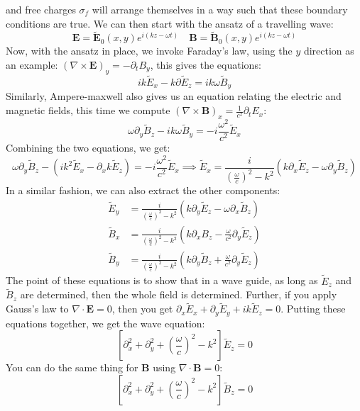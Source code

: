 \) and free charges \( \sigma_f \) will arrange themselves in a way such that these boundary conditions are
true. We can then start with the ansatz of a travelling wave:
\[
	\mathbf{E} = \tilde{\mathbf{E}}_0(x, y)e^{i(kz - \omega t)} \quad \mathbf{B} = \tilde{\mathbf{B}}_0(x, y) e^{i(kz
	- \omega t)}
\]
Now, with the ansatz in place, we invoke Faraday's law, using the \( y \) direction as an example:
\( (\nabla \times \mathbf{E})_y = -\partial_t B_y \), this gives the equations:
\[
	ik \tilde E_x - k \partial \tilde E_z = ik \omega \tilde B_y
\]
Similarly, Ampere-maxwell also gives us an equation relating the electric and magnetic fields, this time we
compute \( (\nabla \times \mathbf{B})_x = \frac{1}{c^2}\partial_t E_x \):
\[
	\omega \partial_y \tilde B_z - i k \omega \tilde B_y = -i \frac{\omega^2}{c^2}\tilde E_x
\]
Combining the two equations, we get:
\[
	\omega \partial_y \tilde B_z - (ik^2 \tilde E_x - \partial_x k \tilde E_z) = -i
	\frac{\omega^2}{c^2}\tilde E_x \implies \tilde E_x = \frac{i}{\left( \frac{\omega}{c} \right)^2 - k^2}(k
	\partial_x \tilde E_z - \omega \partial_y \tilde B_z)
\]
In a similar fashion, we can also extract the other components:
\begin{align*}
	\tilde E_y &= \frac{i}{\left( \frac{\omega}{c} \right)^2 - k^2} (k \partial_y \tilde E_z - \omega
	\partial_x \tilde B_z)\\
	\tilde B_x &= \frac{i}{\left( \frac{\omega}{c} \right)^2 - k^2}(k \partial_x B_z -
	\frac{\omega}{c^2}\partial_y \tilde E_z)\\
	\tilde B_y &= \frac{i}{\left( \frac{\omega}{c} \right)^2 - k^2} (k \partial_y \tilde B_z +
	\frac{\omega}{c^2}\partial_y \tilde E_z)
\end{align*}
The point of these equations is to show that in a wave guide, as long as \( \tilde E_z \) and \( \tilde B_z \) 
are determined, then the whole field is determined. Further, if you apply Gauss's law to \( \nabla \cdot
\mathbf{E} = 0 \), then you get \( \partial_x \tilde E_x + \partial_y \tilde E_y + ik \tilde E_z = 0 \).
Putting these equations together, we get the wave equation:
\[
	\left[ \partial_x^2 + \partial_y^2 + \left( \frac{\omega}{c} \right)^2 - k^2 \right]\tilde E_z = 0
\]
You can do the same thing for \( \mathbf{B} \) using \( \nabla \cdot \mathbf{B} = 0  \):
\[
	\left[ \partial_x^2 + \partial_y^2 + \left( \frac{\omega}{c} \right)^2 - k^2 \right]\tilde B_z = 0
\]
